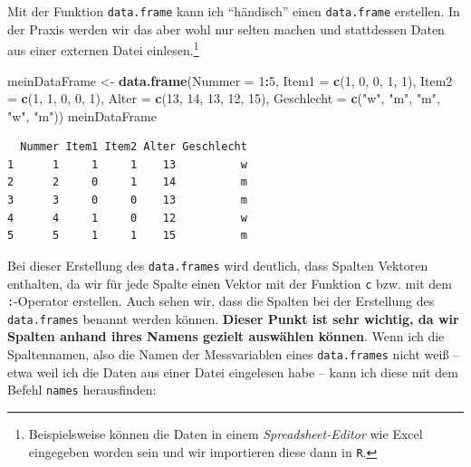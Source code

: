\documentclass[12pt,]{tufte-book}
\newenvironment{Shaded}{\begin{snugshade}}{\end{snugshade}}
\newcommand{\KeywordTok}[1]{\textcolor[rgb]{0.13,0.29,0.53}{\textbf{#1}}}
\newcommand{\DataTypeTok}[1]{\textcolor[rgb]{0.13,0.29,0.53}{#1}}
\newcommand{\DecValTok}[1]{\textcolor[rgb]{0.00,0.00,0.81}{#1}}
\newcommand{\StringTok}[1]{\textcolor[rgb]{0.31,0.60,0.02}{#1}}
\newcommand{\OperatorTok}[1]{\textcolor[rgb]{0.81,0.36,0.00}{\textbf{#1}}}
\newcommand{\NormalTok}[1]{#1}
\theoremstyle{definition}
\theoremstyle{definition}
\theoremstyle{definition}
\theoremstyle{remark}
\begin{document}
Mit der Funktion \texttt{data.frame} kann ich ``händisch'' einen
\texttt{data.frame} erstellen. In der Praxis werden wir das aber wohl
nur selten machen und stattdessen Daten aus einer externen Datei
einlesen.\footnote{Beispielsweise können die Daten in einem
  \emph{Spreadsheet-Editor} wie Excel eingegeben worden sein und wir
  importieren diese dann in \texttt{R}.}

\begin{Shaded}
\begin{Highlighting}[]
\NormalTok{meinDataFrame <-}\StringTok{ }\KeywordTok{data.frame}\NormalTok{(}\DataTypeTok{Nummer =} \DecValTok{1}\OperatorTok{:}\DecValTok{5}\NormalTok{, }\DataTypeTok{Item1 =} \KeywordTok{c}\NormalTok{(}\DecValTok{1}\NormalTok{, }
    \DecValTok{0}\NormalTok{, }\DecValTok{0}\NormalTok{, }\DecValTok{1}\NormalTok{, }\DecValTok{1}\NormalTok{), }\DataTypeTok{Item2 =} \KeywordTok{c}\NormalTok{(}\DecValTok{1}\NormalTok{, }\DecValTok{1}\NormalTok{, }\DecValTok{0}\NormalTok{, }\DecValTok{0}\NormalTok{, }\DecValTok{1}\NormalTok{), }\DataTypeTok{Alter =} \KeywordTok{c}\NormalTok{(}\DecValTok{13}\NormalTok{, }
    \DecValTok{14}\NormalTok{, }\DecValTok{13}\NormalTok{, }\DecValTok{12}\NormalTok{, }\DecValTok{15}\NormalTok{), }\DataTypeTok{Geschlecht =} \KeywordTok{c}\NormalTok{(}\StringTok{"w"}\NormalTok{, }\StringTok{"m"}\NormalTok{, }
    \StringTok{"m"}\NormalTok{, }\StringTok{"w"}\NormalTok{, }\StringTok{"m"}\NormalTok{))}
\NormalTok{meinDataFrame}
\end{Highlighting}
\end{Shaded}

\begin{verbatim}
  Nummer Item1 Item2 Alter Geschlecht
1      1     1     1    13          w
2      2     0     1    14          m
3      3     0     0    13          m
4      4     1     0    12          w
5      5     1     1    15          m
\end{verbatim}

Bei dieser Erstellung des \texttt{data.frames} wird deutlich, dass
Spalten Vektoren enthalten, da wir für jede Spalte einen Vektor mit der
Funktion \texttt{c} bzw. mit dem \texttt{:}-Operator erstellen. Auch
sehen wir, dass die Spalten bei der Erstellung des \texttt{data.frames}
benannt werden können. \textbf{Dieser Punkt ist sehr wichtig, da wir
Spalten anhand ihres Namens gezielt auswählen können}. Wenn ich die
Spaltennamen, also die Namen der Messvariablen eines
\texttt{data.frames} nicht weiß -- etwa weil ich die Daten aus einer
Datei eingelesen habe -- kann ich diese mit dem Befehl \texttt{names}
herausfinden:
\end{document}
